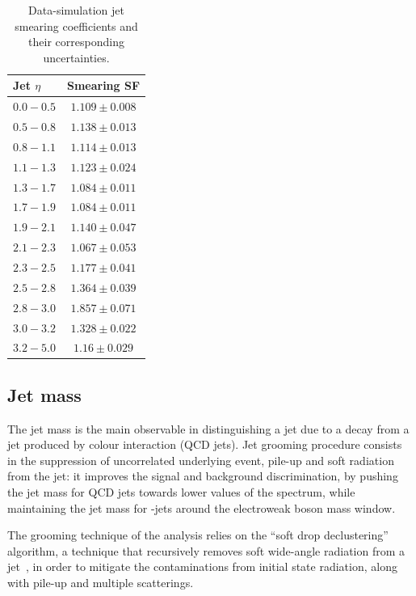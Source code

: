 \begin{table}[!htb]
  \centering
  \caption{Data-simulation jet smearing coefficients and their corresponding uncertainties.}
  \begin{tabular}{l|c}
    Jet $\eta$ & Smearing SF \\
    \hline
    \hline
    $0.0-0.5$ & $1.109 \pm 0.008$ \\
    $0.5-0.8$ & $1.138 \pm 0.013$ \\
    $0.8-1.1$ & $1.114 \pm 0.013$ \\
    $1.1-1.3$ & $1.123 \pm 0.024$ \\
    $1.3-1.7$ & $1.084 \pm 0.011$ \\
    $1.7-1.9$ & $1.084 \pm 0.011$ \\
    $1.9-2.1$ & $1.140 \pm 0.047$ \\
    $2.1-2.3$ & $1.067 \pm 0.053$ \\
    $2.3-2.5$ & $1.177 \pm 0.041$ \\
    $2.5-2.8$ & $1.364 \pm 0.039$ \\
    $2.8-3.0$ & $1.857 \pm 0.071$ \\
    $3.0-3.2$ & $1.328 \pm 0.022$ \\
    $3.2-5.0$ & $1.16  \pm 0.029$ \\
  \end{tabular}
  

  \label{tab:smear}
\end{table}

\subsection{Jet mass}\label{ssec:jetmass}

The jet mass is the main observable in distinguishing a jet due to a \V decay from a jet produced by colour interaction (QCD jets). Jet grooming procedure consists in the suppression of uncorrelated underlying event, pile-up and soft radiation from the jet: it improves the signal and background discrimination, by pushing the jet mass for QCD jets towards lower values of the spectrum, while maintaining the jet mass for \V-jets around the electroweak boson mass window.

\noindent The grooming technique of the analysis relies on the ``soft drop declustering'' algorithm, a technique that recursively removes soft wide-angle radiation from a jet~\cite{Larkoski:2014wba}, in order to mitigate the contaminations from initial state radiation, along with pile-up and multiple scatterings.

